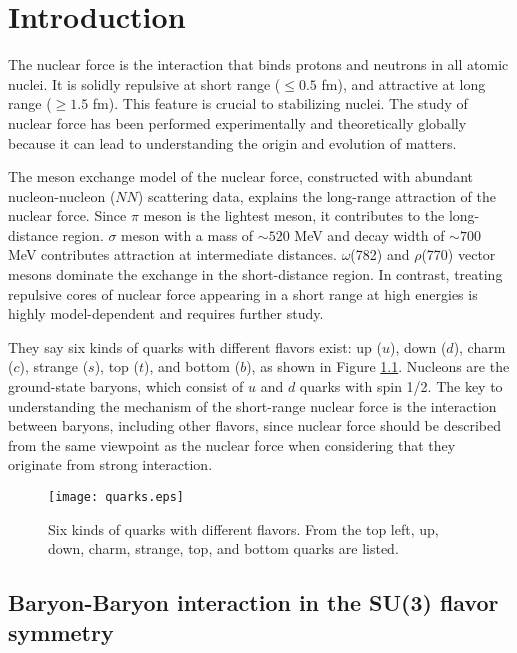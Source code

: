 %
\graphicspath{{./pictures/chapter1/}}

\chapter{Introduction} 
\label{chap1}
The nuclear force is the interaction that binds protons and neutrons in all atomic nuclei. It is solidly repulsive at short range ($\leq0.5$ fm), and attractive at long range ($\geq1.5$ fm). This feature is crucial to stabilizing nuclei. The study of nuclear force has been performed experimentally and theoretically globally because it can lead to understanding the origin and evolution of matters. 

The meson exchange model of the nuclear force, constructed with abundant nucleon-nucleon ($NN$) scattering data, explains the long-range attraction of the nuclear force. Since $\pi$ meson is the lightest meson, it contributes to the long-distance region. $\sigma$ meson with a mass of $\sim520$ MeV and decay width of $\sim700$ MeV contributes attraction at intermediate distances. $\omega$(782) and $\rho$(770) vector mesons dominate the exchange in the short-distance region. In contrast, treating repulsive cores of nuclear force appearing in a short range at high energies is highly model-dependent and requires further study. 

They say six kinds of quarks with different flavors exist: up ($u$), down ($d$), charm ($c$), strange ($s$), top ($t$), and bottom ($b$), as shown in Figure \ref{fig-quarks}. Nucleons are the ground-state baryons, which consist of $u$ and $d$ quarks with spin 1/2. The key to understanding the mechanism of the short-range nuclear force is the interaction between baryons, including other flavors, since nuclear force should be described from the same viewpoint as the nuclear force when considering that they originate from strong interaction. 
\begin{figure}[h!]
  \begin{center}
  \texttt{[image: quarks.eps]}
  \caption{Six kinds of quarks with different flavors. From the top left, up, down, charm, strange, top, and bottom quarks are listed.}
  \label{fig-quarks}
  \end{center}
\end{figure}

\section{Baryon-Baryon interaction in the SU(3) flavor symmetry}
\label{sec-BBint}

